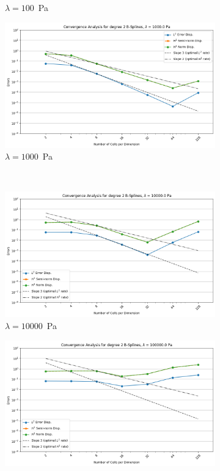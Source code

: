 \documentclass[a4paper,12pt,twoside]{report}
\begin{document}
\begin{figure}
\begin{subfigure}[b]{0.49\textwidth}
		\caption{$\lambda=100$~Pa}
	\end{subfigure}
	\begin{subfigure}[b]{0.49\textwidth}
		\centering
		\includegraphics[width=\textwidth]{figures/figures_increasing_lambda_non_mixed/convergence_plot_degree_2_lambda=1000.0.png}
		\caption{$\lambda=1000$~Pa}
	\end{subfigure}
	\\
	\begin{subfigure}[b]{0.49\textwidth}
		\centering
		\includegraphics[width=\textwidth]{figures/figures_increasing_lambda_non_mixed/convergence_plot_degree_2_lambda=10000.0.png}
		\caption{$\lambda=10000$~Pa}
	\end{subfigure}
	\begin{subfigure}[b]{0.49\textwidth}
		\centering
		\includegraphics[width=\textwidth]{figures/figures_increasing_lambda_non_mixed/convergence_plot_degree_2_lambda=100000.0.png}

\end{subfigure}
\end{figure}
\end{document}
